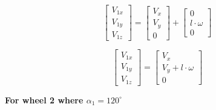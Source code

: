 \documentclass[answers]{exam}
\begin{document}
\begin{questions}
\begin{parts}
\begin{solution}
            \begin{equation*}
                \begin{bmatrix}
                    V_{1x} \\
                    V_{1y} \\
                    V_{1z}
                \end{bmatrix}
                = \begin{bmatrix}
                    V_x \\
                    V_y \\
                    0
                \end{bmatrix}
                + \begin{bmatrix}
                    0              \\
                    l \cdot \omega \\
                    0
                \end{bmatrix}
            \end{equation*}

            \begin{equation} \label{eq:1}
                \begin{bmatrix}
                    V_{1x} \\
                    V_{1y} \\
                    V_{1z}
                \end{bmatrix}
                = \begin{bmatrix}
                    V_x                  \\
                    V_y + l \cdot \omega \\
                    0
                \end{bmatrix}
            \end{equation}

            \textbf{For wheel 2 where $\alpha_1 = 120^\circ$}


\end{solution}
\end{parts}
\end{questions}
\end{document}
